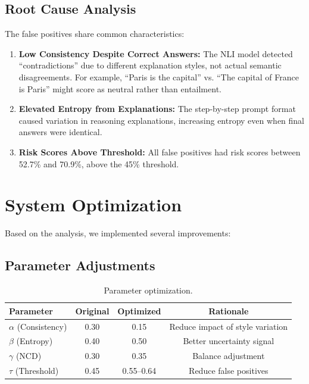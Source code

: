 \subsection{Root Cause Analysis}

The false positives share common characteristics:

\begin{enumerate}
    \item \textbf{Low Consistency Despite Correct Answers:} The NLI model detected ``contradictions'' due to different explanation styles, not actual semantic disagreements. For example, ``Paris is the capital'' vs. ``The capital of France is Paris'' might score as neutral rather than entailment.

    \item \textbf{Elevated Entropy from Explanations:} The step-by-step prompt format caused variation in reasoning explanations, increasing entropy even when final answers were identical.

    \item \textbf{Risk Scores Above Threshold:} All false positives had risk scores between 52.7\% and 70.9\%, above the 45\% threshold.
\end{enumerate}

\section{System Optimization}

Based on the analysis, we implemented several improvements:

\subsection{Parameter Adjustments}

\begin{table}[!htbp]
    \centering
    \caption{Parameter optimization.}
    \label{tab:optimization}
    \begin{tabular}{lccc}
        \toprule
        Parameter & Original & Optimized & Rationale \\
        \midrule
        $\alpha$ (Consistency) & 0.30 & 0.15 & Reduce impact of style variation \\
        $\beta$ (Entropy) & 0.40 & 0.50 & Better uncertainty signal \\
        $\gamma$ (NCD) & 0.30 & 0.35 & Balance adjustment \\
        $\tau$ (Threshold) & 0.45 & 0.55--0.64 & Reduce false positives \\
        \bottomrule
    \end{tabular}
\end{table}


